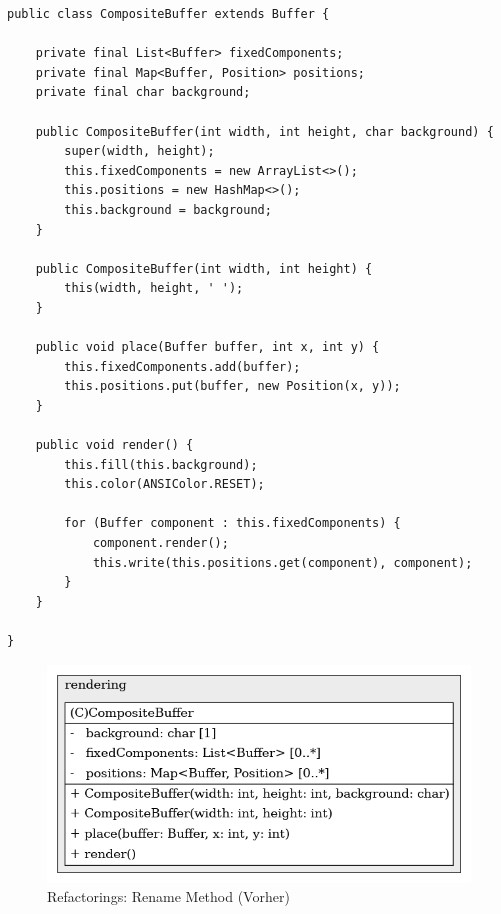 \vspace{0.5cm}
\begin{lstlisting}[caption={Refactorings: Rename Method (Vorher)}]
public class CompositeBuffer extends Buffer {
    
    private final List<Buffer> fixedComponents;
    private final Map<Buffer, Position> positions;
    private final char background;
    
    public CompositeBuffer(int width, int height, char background) {
        super(width, height);
        this.fixedComponents = new ArrayList<>();
        this.positions = new HashMap<>();
        this.background = background;
    }
    
    public CompositeBuffer(int width, int height) {
        this(width, height, ' ');
    }
    
    public void place(Buffer buffer, int x, int y) {
        this.fixedComponents.add(buffer);
        this.positions.put(buffer, new Position(x, y));
    }
    
    public void render() {
        this.fill(this.background);
        this.color(ANSIColor.RESET);
        
        for (Buffer component : this.fixedComponents) {
            component.render();
            this.write(this.positions.get(component), component);
        }
    }
    
}
\end{lstlisting}

\vspace{0.5cm}
\begin{figure}[H]
    \centering
    \includegraphics[width=0.6\linewidth]{Bilder/Visualisierung/CompositeBufferPlaceFunction_structure.png}
    \caption{Refactorings: Rename Method (Vorher)}
\end{figure}

